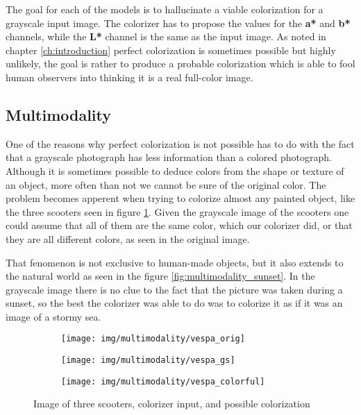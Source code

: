 The goal for each of the models is to hallucinate a viable colorization for a grayscale 
input image. The colorizer has to propose the values for the \textbf{a*} and \textbf{b*}
channels, while the \textbf{L*} channel is the same as the input image. As noted in chapter \ref{ch:introduction}
perfect colorization is sometimes possible but highly unlikely, the goal is rather to 
produce a probable colorization which is able to fool human observers into thinking it is a 
real full-color image.

\subsection{Multimodality}
\label{sec:multimodality}

One of the reasons why perfect colorization is not possible has to do with the 
fact that a grayscale photograph has less information than a colored photograph.
Although it is sometimes possible to deduce colors from the shape or texture of
an object, more often than not we cannot be sure of the original color.
The problem becomes apperent when trying to colorize almost any painted object,
like the three scooters seen in figure \ref{fig:multimodality_scooters}. Given the 
grayscale image of the scooters one could assume that all of them are the same
color, which our colorizer did, or that they are all different colors, as seen 
in the original image. 

That fenomenon is not exclusive to human-made objects, 
but it also extends to the natural world as seen in the figure 
\ref{fig:multimodality_sunset}. In the grayscale image there is no clue to the 
fact that the picture was taken during a sunset, so the best the colorizer
was able to do was to colorize it as if it was an image of a stormy sea.

\begin{figure}
	\centering
	\begin{subfigure}{.32\textwidth}
		\centering
		\texttt{[image: img/multimodality/vespa\_orig]}
	\end{subfigure}
	\begin{subfigure}{.32\textwidth}
		\centering
		\texttt{[image: img/multimodality/vespa\_gs]}
	\end{subfigure}
    \begin{subfigure}{.32\textwidth}
		\centering
		\texttt{[image: img/multimodality/vespa\_colorful]}
	\end{subfigure}
    \caption{Image of three scooters, colorizer input, and possible colorization}
	\label{fig:multimodality_scooters}
\end{figure}

